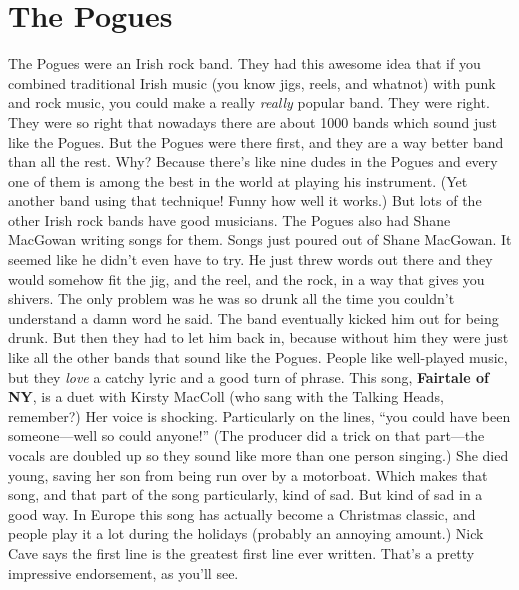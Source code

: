 \documentclass[letterpaper,single]{article}
\begin{document}
\section{The Pogues}
The Pogues were an Irish rock band. 
They had this awesome idea that if you combined traditional Irish music (you know jigs, reels, and whatnot) with punk and rock music, you could make a really \emph{really} popular band. 
They were right. 
They were so right that nowadays there are about 1000 bands which sound just like the Pogues. 
But the Pogues were there first, and they are a way better band than all the rest. 
Why? 
Because there's like nine dudes in the Pogues and every one of them is among the best in the world at playing his instrument. (Yet another band using that technique! Funny how well it works.) 
But lots of the other Irish rock bands have good musicians. 
The Pogues also had Shane MacGowan writing songs for them. 
Songs just poured out of Shane MacGowan. 
It seemed like he didn't even have to try. 
He just threw words out there and they would somehow fit the jig, and the reel, and the rock, in a way that gives you shivers. 
The only problem was he was so drunk all the time you couldn't understand a damn word he said. 
The band eventually kicked him out for being drunk. 
But then they had to let him back in, because without him they were just like all the other bands that sound like the Pogues.
People like well-played music, but they \emph{love} a catchy lyric and a good turn of phrase. 
This song, \textbf{Fairtale of NY}, is a duet with Kirsty MacColl (who sang with the Talking Heads, remember?) 
Her voice is shocking. 
Particularly on the lines, ``you could have been someone---well so could anyone!''
(The producer did a trick on that part---the vocals are doubled up so they sound like more than one person singing.) 
She died young, saving her son from being run over by a motorboat. Which makes that song, and that part of the song particularly, kind of sad. But kind of sad in a good way.
In Europe this song has actually become a Christmas classic, and people play it a lot during the holidays (probably an annoying amount.) 
Nick Cave says the first line is the greatest first line ever written.
That's a pretty impressive endorsement, as you'll see.
\end{document}
